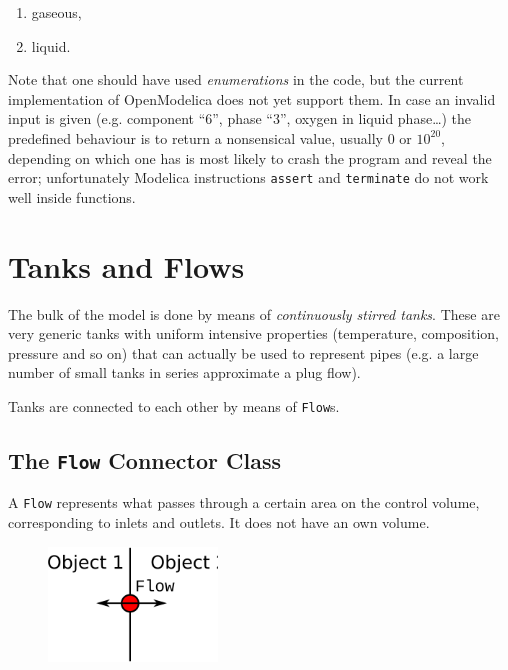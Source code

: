 \documentclass[a4paper]{article}
\begin{document}
\begin{enumerate}
\item gaseous,
\item liquid.
\end{enumerate}

Note that one should have used \emph{enumerations} in the code, but the current
implementation of OpenModelica does not yet support them. In case an invalid
input is given (e.g. component ``6'', phase ``3'', oxygen in liquid phase\ldots)
the predefined behaviour is to return a nonsensical value, usually 0 or
$10^{20}$, depending on which one has is most likely to crash the program and
reveal the error; unfortunately Modelica instructions \texttt{assert} and
\texttt{terminate} do not work well inside functions.

\section{Tanks and Flows}
The bulk of the model is done by means of \emph{continuously stirred tanks}.
These are very generic tanks with uniform intensive properties (temperature,
composition, pressure and so on) that can actually be used to represent pipes
(e.g. a large number of small tanks in series approximate a plug flow).

Tanks are connected to each other by means of \texttt{Flow}s.

\subsection{The \texttt{Flow} Connector Class}
A \texttt{Flow} represents what passes through a certain area on the control
volume, corresponding to inlets and outlets. It does not have an own volume.

\begin{figure}[h]
\centering
\includegraphics[width=0.4\textwidth]{pics/flow}
\end{figure}
\end{document}
